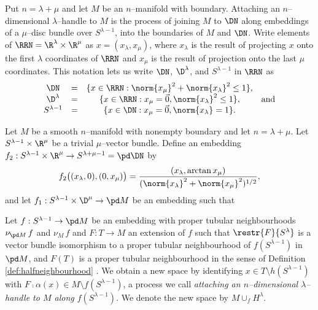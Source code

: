 Put $n=\lambda+\mu$ and let $M$ be an $n$--manifold with boundary.
Attaching an $n$--dimensional $\lambda$--handle to $M$ is the process of joining $M$ to $\DN$ along embeddings of a $\mu$--disc bundle over $S^{\lambda-1}$, into the boundaries of $M$ and $\DN$.
Write elements of $\RRN=\R^\lambda\times\R^\mu$ as $x=(x_\lambda,x_\mu)$, where $x_\lambda$ is the result of projecting $x$ onto the first $\lambda$ coordinates of $\RRN$ and $x_\mu$ is the result of projection onto the last $\mu$ coordinates.
This notation lets us write $\DN$, $\D^\lambda$, and $S^{\lambda-1}$ in $\RRN$ as
\[
\begin{array}{cccr}
\DN & = & \{x\in\RRN : \norm{x_\mu}^2 + \norm{x_\lambda}^2 \leq 1\}, & \\
\D^\lambda & = & \{x\in\RRN : x_\mu=\vec{0}, \norm{x_\lambda}^2 \leq 1\}, & \textrm{and} \\
S^{\lambda-1} & = & \{x\in \DN: x_\mu=\vec{0}, \norm{x_\lambda}=1\}. &
\end{array}
\]

\begin{defn}[Handle]
	Let $M$ be a smooth $n$--manifold with nonempty boundary and let $n=\lambda+\mu$.
	Let $S^{\lambda-1}\times \R^\mu$ be a trivial $\mu$--vector bundle.
	Define an embedding $f_2:S^{\lambda-1}\times\R^\mu\to S^{\lambda+\mu-1}=\pd\DN$ by
	\[
	f_2\big((x_\lambda,0),(0,x_\mu)\big) = \frac{(x_\lambda,\arctan x_\mu)}{(\norm{x_\lambda}^2+\norm{x_\mu}^2)^{1/2}},
	\]
	and let $f_1:S^{\lambda-1}\times\D^\mu\to \pd M$ be an embedding such that 
	
	Let $f:S^{\lambda-1}\to \pd M$ be an embedding with proper tubular neighbourhoods $\nu_{\pd M}\,f$ and $\nu_M\,f$ and $F:T\to M$ an extension of $f$ such that $\restr{F}{S^\lambda}$ is a vector bundle isomorphism to a proper tubular neighbourhood of $f(S^{\lambda-1})$ in $\pd M$, and $F(T)$ is a proper tubular neighbourhood in the sense of Definition \ref{def:halfneighbourhood} .
	We obtain a new space by identifying $x\in T\setminus h(S^{\lambda-1})$ with $F\comp\alpha(x)\in M\setminus f(S^{\lambda-1})$, a process we call \emph{attaching an $n$--dimensional $\lambda$--handle to $M$ along $f(S^{\lambda-1})$}.
	We denote the new space by $M\cup_f H^\lambda$.	
\end{defn}

